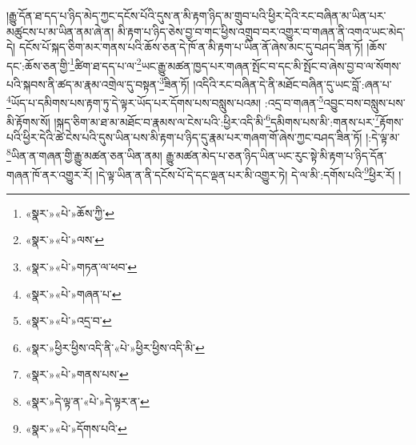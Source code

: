 །རྒྱུ་དོན་ཐ་དད་པ་ཉིད་མེད་ཀྱང་དངོས་པོའི་དུས་ན་མི་རྟག་ཉིད་མ་གྲུབ་པའི་ཕྱིར་དེའི་རང་བཞིན་མ་ཡིན་པར་མཚུངས་པ་མ་ཡིན་ནམ་ཞེ་ན། མི་རྟག་པ་ཉིད་ཅེས་བྱ་བ་གང་ཕྱིས་འགྲུབ་བར་འགྱུར་བ་གཞན་ནི་འགའ་ཡང་མེད་དེ། དངོས་པོ་སྐད་ཅིག་མར་གནས་པའི་ཆོས་ཅན་དེ་ཁོ་ན་མི་རྟག་པ་ཡིན་ནོ་ཞེས་མང་དུ་བཤད་ཟིན་ཏོ། །ཆོས་དང་:ཆོས་ཅན་གྱི་\footnote{«སྣར་»«པེ་»ཆོས་ཀྱི་}ཚིག་ཐ་དད་པ་ལ་\footnote{«སྣར་»«པེ་»ལས་}ཡང་རྒྱུ་མཚན་ཁྱད་པར་གཞན་སྤོང་བ་དང་མི་སྤོང་བ་ཞེས་བྱ་བ་ལ་སོགས་པའི་སྐབས་ནི་ཚད་མ་རྣམ་འགྲེལ་དུ་བསྟན་\footnote{«སྣར་»«པེ་»གཏན་ལ་ཕབ་}ཟིན་ཏོ། །འདིའི་རང་བཞིན་དེ་ནི་མཐོང་བཞིན་དུ་ཡང་བློ་:ཞན་པ་\footnote{«སྣར་»«པེ་»གཞན་པ་}ཡོད་པ་དམིགས་པས་རྟག་ཏུ་དེ་ལྟར་ཡོད་པར་དོགས་པས་བསླུས་པའམ། :འདྲ་བ་གཞན་\footnote{«སྣར་»«པེ་»འདྲ་བ་}འབྱུང་བས་བསླུས་པས་མི་རྟོགས་སོ། །སྐད་ཅིག་མ་ཐ་མ་མཐོང་བ་རྣམས་ལ་ངེས་པའི་:ཕྱིར་འདི་མི་\footnote{«སྣར་»ཕྱིར་ཕྱིས་འདི་ནི་«པེ་»ཕྱིར་ཕྱིས་འདི་མི་}དམིགས་པས་མི་:གནས་པར་\footnote{«སྣར་»«པེ་»གནས་པས་}རྟོགས་པའི་ཕྱིར་དེའི་ཚེ་ངེས་པའི་དུས་ཡིན་པས་མི་རྟག་པ་ཉིད་དུ་རྣམ་པར་གཞག་གོ་ཞེས་ཀྱང་བཤད་ཟིན་ཏོ། །:དེ་ལྟ་མ་\footnote{«སྣར་»དེ་ལྟ་ན་«པེ་»དེ་ལྟར་ན་}ཡིན་ན་གཞན་གྱི་རྒྱུ་མཚན་ཅན་ཡིན་ནམ། རྒྱུ་མཚན་མེད་པ་ཅན་ཉིད་ཡིན་ཡང་རུང་སྟེ་མི་རྟག་པ་ཉིད་དོན་གཞན་ཁོ་ནར་འགྱུར་རོ། །དེ་ལྟ་ཡིན་ན་ནི་དངོས་པོ་དེ་དང་ལྡན་པར་མི་འགྱུར་ཏེ། དེ་ལ་མི་:དགོས་པའི་\footnote{«སྣར་»«པེ་»དོགས་པའི་}ཕྱིར་རོ། །
